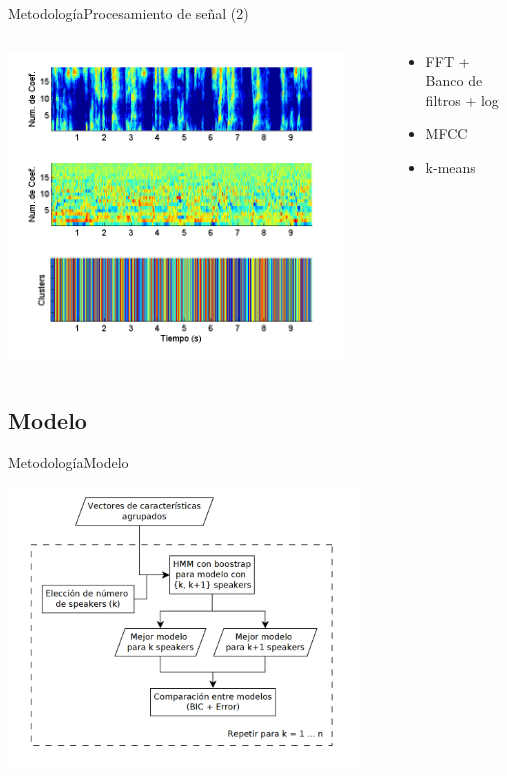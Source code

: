 \documentclass[10pt]{beamer}
\begin{document}
\begin{frame}{Metodología}{Procesamiento de señal (2)}
\small {
\vspace{0mm} 
\begin{columns}   
  \begin{column}{0.6\textwidth} 
    \hfill  
    \includegraphics[width=0.9\textwidth]{gfx/filename52}    
  \end{column}
  \begin{column}{0.4\textwidth}
    \vspace{-8mm} 
    \begin{itemize}
      \setlength{\itemindent}{-2em}      
      \itemsep 4.6em    
      \item FFT + Banco de filtros + log
      \item MFCC
      \item k-means
    \end{itemize}
  \end{column}   
\end{columns}   
}
\end{frame}

\subsection{Modelo}
\begin{frame}{Metodología}{Modelo}
  \begin{center}
    \includegraphics[width=0.7\textwidth]{gfx/dia-hmm}
  \end{center}
\end{frame}
\end{document}
